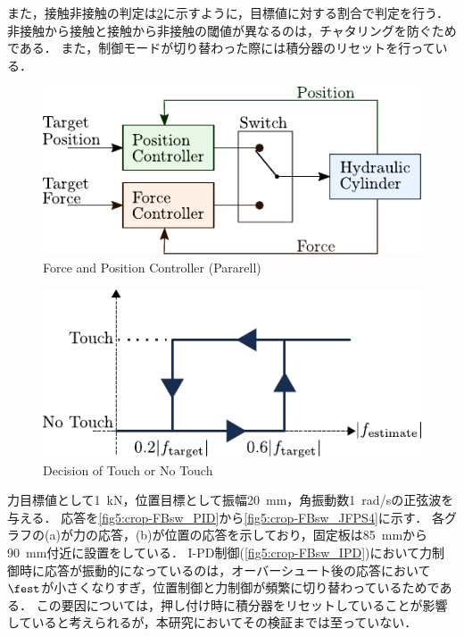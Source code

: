 また，接触非接触の判定は\figname\ref{fig5:touch_define}に示すように，目標値に対する割合で判定を行う．
非接触から接触と接触から非接触の閾値が異なるのは，チャタリングを防ぐためである．
また，制御モードが切り替わった際には積分器のリセットを行っている．

\begin{figure}[t]
    \centering
        \includegraphics[keepaspectratio, scale=1.0]{contents/IntegrationControl/figure/pararell_torqueandposition.pdf}
        \caption{Force and Position Controller (Pararell)}
        \label{fig5:pararell_torqueandposition}
\end{figure}

\begin{figure}[t]
    \centering
        \includegraphics[keepaspectratio, scale=1.0]{contents/IntegrationControl/figure/touch_define.pdf}
        \caption{Decision of Touch or No Touch}
        \label{fig5:touch_define}
\end{figure}

力目標値として\SI{1}{kN}，位置目標として振幅\SI{20}{mm}，角振動数\SI{1}{rad/s}の正弦波を与える．
応答を\figname\ref{fig5:crop-FBsw_PID}から\figname\ref{fig5:crop-FBsw_JFPS4}に示す．
各グラフの(a)が力の応答，(b)が位置の応答を示しており，固定板は\SI{85}{mm}から\SI{90}{mm}付近に設置をしている．
I-PD制御(\figname\ref{fig5:crop-FBsw_IPD})において力制御時に応答が振動的になっているのは，オーバーシュート後の応答において$\fest$が小さくなりすぎ，位置制御と力制御が頻繁に切り替わっているためである．
この要因については，押し付け時に積分器をリセットしていることが影響していると考えられるが，本研究においてその検証までは至っていない．

